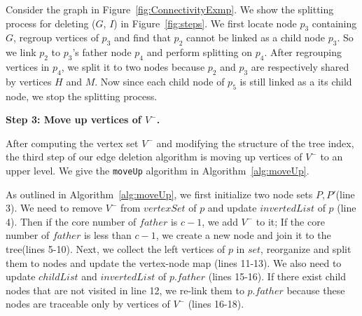 \begin{example}
\label{em:steps}
Consider the graph in Figure~\ref{fig:ConnectivityExmp}.
We show the splitting process for deleting ($G$, $I$) in Figure~\ref{fig:steps}.
We first locate node $p_3$ containing $G$, regroup vertices of $p_3$ and find that $p_2$ cannot be linked as a child node $p_3$. So we link $p_2$ to $p_3$'s father node $p_4$ and perform splitting on $p_4$.
After regrouping vertices in $p_4$, we split it to two nodes because $p_2$ and $p_3$ are respectively shared by vertices $H$ and $M$.
Now since each child node of $p_5$ is still linked as a its child node,
we stop the splitting process.
\end{example}


\textbf{Step 3: Move up vertices of $V^-$.}

After computing the vertex set $V^-$ and modifying the structure of the tree index, the third step of our edge deletion algorithm is moving up vertices of $V^-$ to an upper level. We give the {\tt moveUp} algorithm in Algorithm~\ref{alg:moveUp}.

As outlined in Algorithm~\ref{alg:moveUp}, we first initialize two node sets $P,P'$(line 3). We need to remove $V^-$ from $vertexSet$ of $p$ and update $invertedList$ of $p$ (line 4). Then if the core number of $father$ is $c-1$, we add $V^-$ to it; If the core number of $father$ is less than $c-1$, we create a new node and join it to the tree(lines 5-10). Next, we collect the left vertices of $p$ in $set$, reorganize and split them to nodes and update the vertex-node map (lines 11-13). We also need to update $childList$ and $invertedList$ of $p.father$ (lines 15-16). If there exist child nodes that are not visited in line 12, we re-link them to $p.father$ because these nodes are traceable only by vertices of $V^-$ (lines 16-18).




